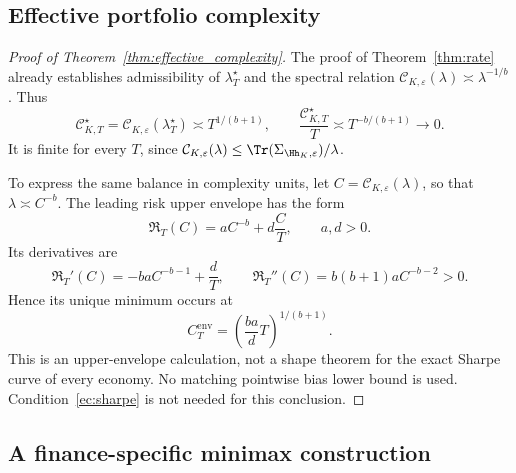 \subsection{Effective portfolio complexity}
\label{app:complexity}

\begin{proof}[Proof of Theorem~\ref{thm:effective_complexity}]
The proof of Theorem~\ref{thm:rate} already establishes admissibility of
$\lambda_T^\star$ and the spectral relation
$\mathcal C_{K,\varepsilon}(\lambda)\asymp\lambda^{-1/b}$. Thus
\[
\mathcal C^\star_{K,T}
=\mathcal C_{K,\varepsilon}(\lambda_T^\star)
\asymp T^{1/(b+1)},
\qquad
\frac{\mathcal C^\star_{K,T}}{T}
\asymp T^{-b/(b+1)}\longrightarrow0.
\]
It is finite for every $T$, since
$\mathcal C_{K,\varepsilon}(\lambda)\leq
\Tr(\Sigma_{\Hh_K,\varepsilon})/\lambda$.

To express the same balance in complexity units, let
$C=\mathcal C_{K,\varepsilon}(\lambda)$, so that $\lambda\asymp C^{-b}$.
The leading risk upper envelope has the form
\[
\mathfrak R_T(C)=aC^{-b}+d\frac CT,
\qquad a,d>0.
\]
Its derivatives are
\[
\mathfrak R_T'(C)=-baC^{-b-1}+\frac dT,
\qquad
\mathfrak R_T''(C)=b(b+1)aC^{-b-2}>0.
\]
Hence its unique minimum occurs at
\[
C_T^{\mathrm{env}}
=\left(\frac{ba}{d}T\right)^{1/(b+1)}.
\]
This is an upper-envelope calculation, not a shape theorem for the exact
Sharpe curve of every economy. No matching pointwise bias lower bound is used. Condition~\ref{ec:sharpe} is not needed for this conclusion.
\end{proof}


\subsection{A finance-specific minimax construction}
\label{app:minimax}

